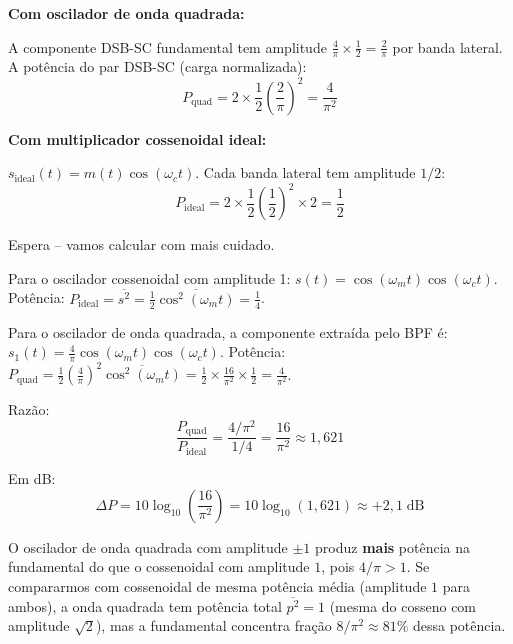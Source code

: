 \documentclass[11pt,a4paper]{article}
\begin{document}
\begin{resolucao}

\textbf{Com oscilador de onda quadrada:}

A componente DSB-SC fundamental tem amplitude $\frac{4}{\pi} \times \frac{1}{2} = \frac{2}{\pi}$ por banda lateral. A potência do par DSB-SC (carga normalizada):
\[
  P_{\text{quad}} = 2 \times \frac{1}{2}\left(\frac{2}{\pi}\right)^2 = \frac{4}{\pi^2}
\]

\textbf{Com multiplicador cossenoidal ideal:}

$s_{\text{ideal}}(t) = m(t)\cos(\omega_c t)$. Cada banda lateral tem amplitude $1/2$:
\[
  P_{\text{ideal}} = 2 \times \frac{1}{2}\left(\frac{1}{2}\right)^2 \times 2 = \frac{1}{2}
\]

Espera -- vamos calcular com mais cuidado.

Para o oscilador cossenoidal com amplitude 1: $s(t) = \cos(\omega_m t)\cos(\omega_c t)$. Potência: $P_{\text{ideal}} = \overline{s^2} = \frac{1}{2}\overline{\cos^2(\omega_m t)} = \frac{1}{4}$.

Para o oscilador de onda quadrada, a componente extraída pelo BPF é:
$s_1(t) = \frac{4}{\pi}\cos(\omega_m t)\cos(\omega_c t)$. Potência: $P_{\text{quad}} = \frac{1}{2}\left(\frac{4}{\pi}\right)^2 \overline{\cos^2(\omega_m t)} = \frac{1}{2} \times \frac{16}{\pi^2} \times \frac{1}{2} = \frac{4}{\pi^2}$.

Razão:
\[
  \frac{P_{\text{quad}}}{P_{\text{ideal}}} = \frac{4/\pi^2}{1/4} = \frac{16}{\pi^2} \approx 1{,}621
\]

Em dB:
\[
  \boxed{\Delta P = 10\log_{10}\!\left(\frac{16}{\pi^2}\right) = 10\log_{10}(1{,}621) \approx +2{,}1\;\text{dB}}
\]

O oscilador de onda quadrada com amplitude $\pm 1$ produz \textbf{mais} potência na fundamental do que o cossenoidal com amplitude $1$, pois $4/\pi > 1$. Se compararmos com cossenoidal de mesma potência média (amplitude $1$ para ambos), a onda quadrada tem potência total $\overline{p^2} = 1$ (mesma do cosseno com amplitude $\sqrt{2}$), mas a fundamental concentra fração $8/\pi^2 \approx 81\%$ dessa potência.
\end{resolucao}
\end{document}
